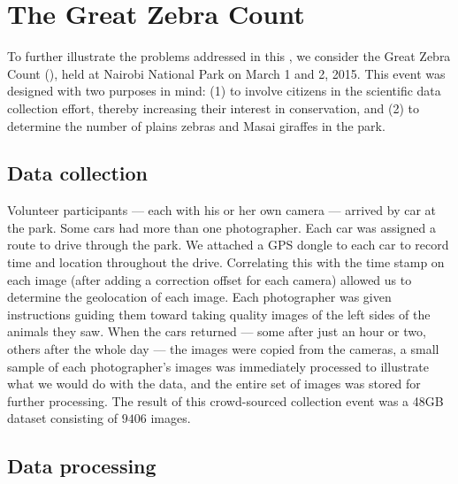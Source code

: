         \AgeFigure{}

        \GashFigure{}

\section{The Great Zebra Count}\label{sec:introgzc}

    To further illustrate the problems addressed in this \thesis{}, we consider the Great Zebra Count (\GZC{}), held at
    Nairobi National Park on March 1\st{} and 2\nd{}, 2015. This event was designed with two purposes in mind: (1) to
    involve citizens in the scientific data collection effort, thereby increasing their interest in conservation, and
    (2) to determine the number of plains zebras and Masai giraffes in the park.

    \subsection{Data collection}
        Volunteer participants --- each with his or her own camera --- arrived by car at the park. Some cars had more
        than one photographer. Each car was assigned a route to drive through the park. We attached a GPS dongle to each
        car to record time and location throughout the drive. Correlating this with the time stamp on each image (after
        adding a correction offset for each camera) allowed us to determine the geolocation of each image. Each
        photographer was given instructions guiding them toward taking quality images of the left sides of the animals
        they saw. When the cars returned --- some after just an hour or two, others after the whole day --- the images
        were copied from the cameras, a small sample of each photographer's images was immediately processed to
        illustrate what we would do with the data, and the entire set of images was stored for further processing. The
        result of this crowd-sourced collection event was a 48GB dataset consisting of $9406$ images.

    \subsection{Data processing}\label{subsec:introdataprocess}

